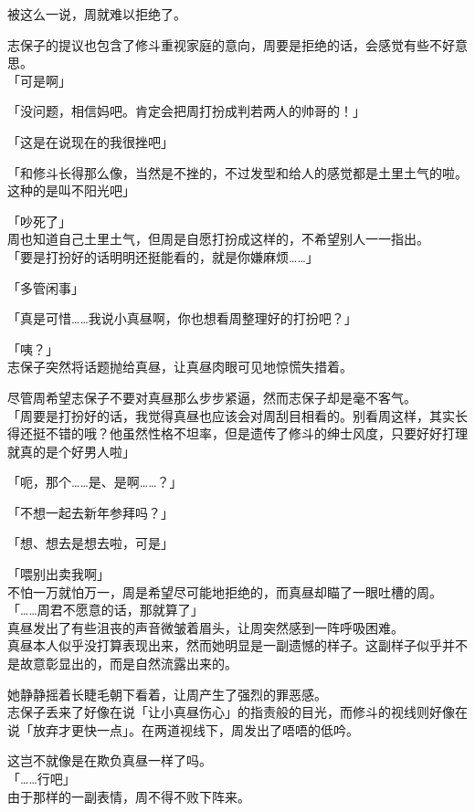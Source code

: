 被这么一说，周就难以拒绝了。

志保子的提议也包含了修斗重视家庭的意向，周要是拒绝的话，会感觉有些不好意思。\\

「可是啊」

「没问题，相信妈吧。肯定会把周打扮成判若两人的帅哥的！」

「这是在说现在的我很挫吧」

「和修斗长得那么像，当然是不挫的，不过发型和给人的感觉都是土里土气的啦。这种的是叫不阳光吧」

「吵死了」\\

周也知道自己土里土气，但周是自愿打扮成这样的，不希望别人一一指出。\\

「要是打扮好的话明明还挺能看的，就是你嫌麻烦……」

「多管闲事」

「真是可惜……我说小真昼啊，你也想看周整理好的打扮吧？」

「咦？」\\

志保子突然将话题抛给真昼，让真昼肉眼可见地惊慌失措着。

尽管周希望志保子不要对真昼那么步步紧逼，然而志保子却是毫不客气。\\

「周要是打扮好的话，我觉得真昼也应该会对周刮目相看的。别看周这样，其实长得还挺不错的哦？他虽然性格不坦率，但是遗传了修斗的绅士风度，只要好好打理就真的是个好男人啦」

「呃，那个……是、是啊……？」

「不想一起去新年参拜吗？」

「想、想去是想去啦，可是」

「喂别出卖我啊」\\

不怕一万就怕万一，周是希望尽可能地拒绝的，而真昼却瞄了一眼吐槽的周。\\

「……周君不愿意的话，那就算了」\\

真昼发出了有些沮丧的声音微皱着眉头，让周突然感到一阵呼吸困难。\\

真昼本人似乎没打算表现出来，然而她明显是一副遗憾的样子。这副样子似乎并不是故意彰显出的，而是自然流露出来的。

她静静摇着长睫毛朝下看着，让周产生了强烈的罪恶感。\\

志保子丢来了好像在说「让小真昼伤心」的指责般的目光，而修斗的视线则好像在说「放弃才更快一点」。在两道视线下，周发出了唔唔的低吟。

这岂不就像是在欺负真昼一样了吗。\\

「……行吧」\\

由于那样的一副表情，周不得不败下阵来。
